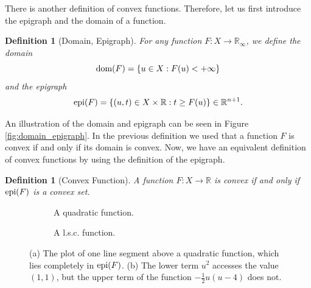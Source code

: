 \documentclass[abstracton]{scrreprt}
\newtheorem{definition}[theorem]{Definition}
\begin{document}
        There is another definition of convex functions. Therefore, let us first introduce the epigraph and the domain of a function.
        \begin{definition}[Domain, Epigraph] %
        \label{def:domain_epigraph}
            For any function $F: X \longrightarrow \mathbb{R}_{\infty}$, we define the domain
                $$
                    \textnormal{dom}(F) = \{ u \in X : F(u) < +\infty \}
                $$
            and the epigraph
                $$
                    \textnormal{epi}(F) = \{ (u, t) \in X \times \mathbb{R}: t \ge F(u) \} \in \mathbb{R}^{n+1}.
                $$
        \end{definition}
        An illustration of the domain and epigraph can be seen in Figure \ref{fig:domain_epigraph}. In the previous definition we used that a function $F$ is convex if and only if its domain is convex. Now, we have an equivalent definition of convex functions by using the definition of the epigraph.
        \begin{definition}[Convex Function] %
        \label{def:convex_function_else}
            A function $F: X \longrightarrow \mathbb{R}$ is convex if and only if $\textnormal{epi}(F)$ is a convex set.
        \end{definition}
        \begin{figure}[!ht]
            \centering
            \begin{subfigure}[b]{0.4\textwidth}
            \caption{A quadratic function.}
            \end{subfigure}
            \begin{subfigure}[b]{0.4\textwidth}
            \caption{A l.s.c. function.}
            \end{subfigure}
            \caption[Example of a convex and a l.s.c. function.]{(a) The plot of one line segment above a quadratic function, which lies completely in $\textnormal{epi}(F)$. (b) The lower term $u^{2}$ accesses the value $(1,1)$, but the upper term of the function $-\frac{1}{2}u(u-4)$ does not.}
            \label{fig:convex_function}
        \end{figure}
\end{document}

